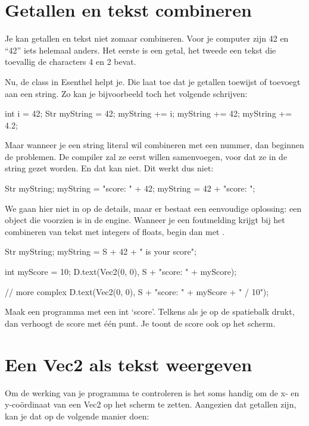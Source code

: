 \section{Getallen en tekst combineren}
Je kan getallen en tekst niet zomaar combineren. Voor je computer zijn 42 en ``42'' iets helemaal anders. Het eerste is een getal, het tweede een tekst die toevallig de characters 4 en 2 bevat. 

Nu, de  class in Esenthel helpt je. Die laat toe dat je getallen toewijst of toevoegt aan een string. Zo kan je bijvoorbeeld toch het volgende schrijven:

\begin{code}
int i = 42;
Str myString =  42;
myString    +=   i; 
myString    +=  42; 
myString    += 4.2; 
\end{code}

Maar wanneer je een string literal wil combineren met een nummer, dan beginnen de problemen. De compiler zal ze eerst willen samenvoegen, voor dat ze in de string gezet worden. En dat kan niet. Dit werkt dus niet:

\begin{code}
Str myString;
myString = "score: " + 42; 
myString = 42 + "score: "; 
\end{code}

We gaan hier niet in op de details, maar er bestaat een eenvoudige oplossing: een  object  die voorzien is in de engine. Wanneer je een foutmelding krijgt bij het combineren van tekst met integers of floats, begin dan met . 

\begin{code}
Str myString;
myString = S + 42  + " is your score"; 

int myScore = 10;
D.text(Vec2(0, 0), S + "score: " + myScore);

// more complex
D.text(Vec2(0, 0), S + "score: " + myScore + " / 10");
\end{code}

\begin{exercise}
Maak een programma met een int `score'. Telkens als je op de spatiebalk drukt, dan verhoogt de score met \'e\'en punt. Je toont de score ook op het scherm.
\end{exercise}

\section{Een Vec2 als tekst weergeven}
Om de werking van je programma te controleren is het soms handig om de x- en y-co\"ordinaat van een Vec2 op het scherm te zetten. Aangezien dat getallen zijn, kan je dat op de volgende manier doen:

